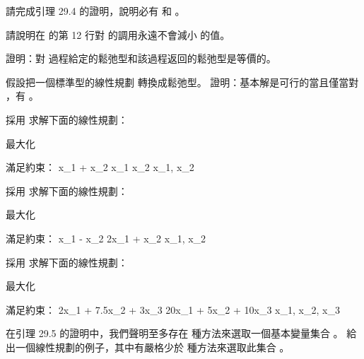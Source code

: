 \startsection[
  title={The simplex algorithm},
]

\startEXERCISE
請完成引理 29.4 的證明，說明必有  和 。
\stopEXERCISE

\startANSWER
{}
\stopANSWER

\startEXERCISE
請說明在  的第 12 行對  的調用永遠不會減小  的值。
\stopEXERCISE

\startANSWER
{}
\stopANSWER

\startEXERCISE
證明：對  過程給定的鬆弛型和該過程返回的鬆弛型是等價的。
\stopEXERCISE

\startANSWER
{}
\stopANSWER

\startEXERCISE
假設把一個標準型的線性規劃  轉換成鬆弛型。
證明：基本解是可行的當且僅當對 ，有 。
\stopEXERCISE

\startANSWER
{}
\stopANSWER

\startEXERCISE
採用  求解下面的線性規劃：

最大化 

滿足約束：
\startformula\startmathalignment[n=5]
\NC x_1 \NC + \NC x_2 \NC \le {} \NR
\NC x_1 \NC   \NC     \NC \le {} \NR
\NC     \NC   \NC x_2 \NC \le {} \NR
\NC     \NC x_1, \NC x_2 \NC \ge {} \NR
\stopmathalignment\stopformula
\stopEXERCISE

\startANSWER
{}
\stopANSWER

\startEXERCISE
採用  求解下面的線性規劃：

最大化 

滿足約束：
\startformula\startmathalignment[n=5]
\NC  x_1 \NC - \NC x_2 \NC \le {} \NR
\NC 2x_1 \NC + \NC x_2 \NC \le {} \NR
\NC     \NC x_1, \NC x_2 \NC \ge {} \NR
\stopmathalignment\stopformula
\stopEXERCISE

\startANSWER
{}
\stopANSWER

\startEXERCISE
採用  求解下面的線性規劃：

最大化 

滿足約束：
\startformula\startmathalignment[n=7,
align={right,right,right,right,right,right,right}]
\NC  2x_1 \NC + \NC 7.5x_2 \NC + \NC  3x_3 \NC \ge {} \NR
\NC 20x_1 \NC + \NC   5x_2 \NC + \NC 10x_3 \NC \ge {} \NR
\NC     \NC x_1, \NC x_2, \NC x_3 \NC      \NC \ge {} \NR
\stopmathalignment\stopformula
\stopEXERCISE

\startANSWER
{}
\stopANSWER

\startEXERCISE
在引理 29.5 的證明中，我們聲明至多存在  種方法來選取一個基本變量集合 。
給出一個線性規劃的例子，其中有嚴格少於  種方法來選取此集合 。
\stopEXERCISE

\startANSWER
{}
\stopANSWER

\stopsection
